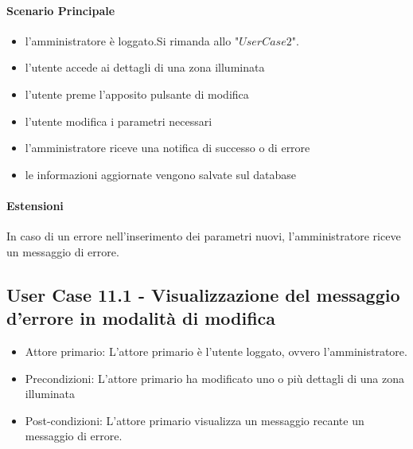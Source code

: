 \documentclass[12pt]{article}
\begin{document}
\paragraph{Scenario Principale}
\begin{itemize}
	\item l'amministratore è loggato.Si rimanda allo "$User Case 2$".
	\item l'utente accede ai dettagli di una zona illuminata
	\item l'utente preme l'apposito pulsante di modifica
	\item l'utente modifica i parametri necessari
	\item l'amministratore riceve una notifica di successo o di errore
	\item le informazioni aggiornate vengono salvate sul database
\end{itemize}
\paragraph{Estensioni} In caso di un errore nell'inserimento dei parametri nuovi, l'amministratore riceve un messaggio di errore.

\subsection{User Case 11.1 - Visualizzazione del messaggio d'errore in modalità di modifica}
\begin{itemize}
	\item Attore primario: L'attore primario è l'utente loggato, ovvero l'amministratore.
	\item Precondizioni: L'attore primario ha modificato uno o più dettagli di una zona illuminata
	\item Post-condizioni: L'attore primario visualizza un messaggio recante un messaggio di errore.
\end{itemize}
\end{document}

